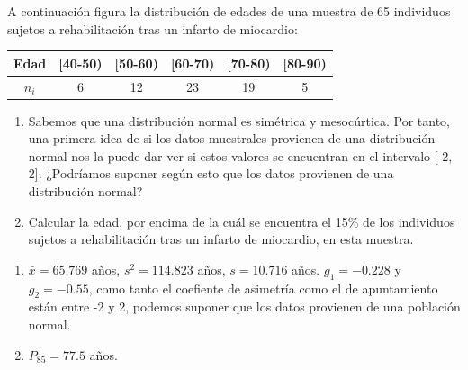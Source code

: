 {A continuación figura la distribución de edades de una muestra de 65 individuos sujetos a rehabilitación tras un infarto de miocardio:
\begin{center}
\begin{tabular}{|c|c|c|c|c|c|}
\hline
Edad & [40-50) & [50-60) & [60-70) & [70-80) & [80-90)  \\ \hline
$n_i$ & 6 & 12 & 23 & 19 & 5  \\ \hline
\end{tabular}
\end{center}
\begin{enumerate}
\item Sabemos que una distribución normal es simétrica y mesocúrtica.
Por tanto, una primera idea de si los datos muestrales provienen de una distribución normal nos la puede dar ver si estos valores se encuentran en el intervalo [-2, 2].
¿Podríamos suponer según esto que los datos provienen de una distribución normal?
\item Calcular la edad, por encima de la cuál se encuentra el 15\% de los individuos sujetos a rehabilitación tras un infarto de miocardio,
en esta muestra.
\end{enumerate}
}
{\begin{enumerate}
\item $\bar x= 65.769$ años, $s^2= 114.823$ años, $s=10.716$ años. $g_1=-0.228$ y $g_2=-0.55$, como tanto el coefiente de asimetría como el de apuntamiento están entre -2 y 2, podemos suponer que los datos provienen de una población normal.
\item $P_{85}=77.5$ años.  
\end{enumerate}
}
{}



